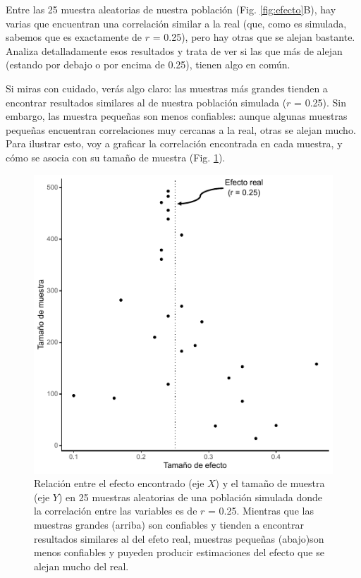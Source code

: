 \documentclass[
  bookmarksnumbered]{article}
\begin{document}
Entre las 25 muestra aleatorias de nuestra población (Fig. \ref{fig:efecto}B), hay varias que encuentran una correlación similar a la real (que, como es simulada, sabemos que es exactamente de \(r\) = 0.25), pero hay otras que se alejan bastante. Analiza detalladamente esos resultados y trata de ver si las que más de alejan (estando por debajo o por encima de 0.25), tienen algo en común.

Si miras con cuidado, verás algo claro: las muestras más grandes tienden a encontrar resultados similares al de nuestra población simulada (\(r\) = 0.25). Sin embargo, las muestra pequeñas son menos confiables: aunque algunas muestras pequeñas encuentran correlaciones muy cercanas a la real, otras se alejan mucho. Para ilustrar esto, voy a graficar la correlación encontrada en cada muestra, y cómo se asocia con su tamaño de muestra (Fig. \ref{fig:dist-sim}).

\begin{figure}

{\centering \includegraphics{images/dist-sim} 

}

\caption{Relación entre el efecto encontrado (eje $X$) y el tamaño de muestra (eje $Y$) en 25 muestras aleatorias de una población simulada donde la correlación entre las variables es de $r$ = 0.25. Mientras que las muestras grandes (arriba) son confiables y tienden a encontrar resultados similares al del efeto real, muestras pequeñas (abajo)son menos confiables y puyeden producir estimaciones del efecto que se alejan mucho del real.}\label{fig:dist-sim}
\end{figure}
\end{document}
